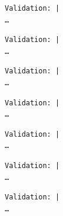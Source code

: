 \documentclass[11pt]{article}
\begin{document}
    
    
    \begin{Verbatim}[commandchars=\\\{\}]
Validation: |                                                                                                 …
    \end{Verbatim}

    
    
    \begin{Verbatim}[commandchars=\\\{\}]
Validation: |                                                                                                 …
    \end{Verbatim}

    
    
    \begin{Verbatim}[commandchars=\\\{\}]
Validation: |                                                                                                 …
    \end{Verbatim}

    
    
    \begin{Verbatim}[commandchars=\\\{\}]
Validation: |                                                                                                 …
    \end{Verbatim}

    
    
    \begin{Verbatim}[commandchars=\\\{\}]
Validation: |                                                                                                 …
    \end{Verbatim}

    
    
    \begin{Verbatim}[commandchars=\\\{\}]
Validation: |                                                                                                 …
    \end{Verbatim}

    
    
    \begin{Verbatim}[commandchars=\\\{\}]
Validation: |                                                                                                 …
    \end{Verbatim}
\end{document}
